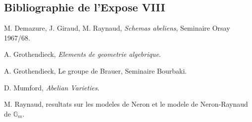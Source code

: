 \documentclass[11pt]{article}
\providecommand{\Gm}{\mathbb G_m}
\begin{document}
\subsection*{Bibliographie de l'Expose VIII}
\begin{enumerate}[label={[\arabic*]}]
\item M. Demazure, J. Giraud, M. Raynaud, \emph{Schemas abeliens}, Seminaire Orsay 1967/68.
\item A. Grothendieck, \emph{Elements de geometrie algebrique}.
\item A. Grothendieck, Le groupe de Brauer, Seminaire Bourbaki.
\item D. Mumford, \emph{Abelian Varieties}.
\item M. Raynaud, resultats sur les modeles de Neron et le modele de Neron-Raynaud de \(\Gm\).
\end{enumerate}
\end{document}
